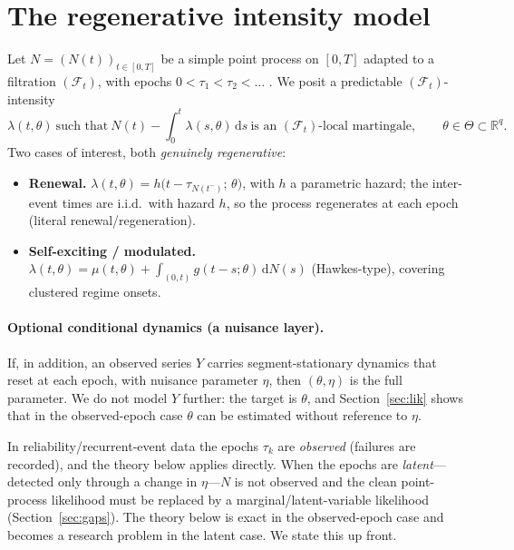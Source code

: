 \documentclass[smallextended,natbib]{svjour3}
\newcommand{\dd}{\,\mathrm{d}}
\newcommand{\R}{\mathbb{R}}
\newcommand{\F}{\mathcal{F}}
\begin{document}
\section{The regenerative intensity model}

Let $N=(N(t))_{t\in[0,T]}$ be a simple point process on $[0,T]$ adapted to a
filtration $(\F_t)$, with epochs $0<\tau_1<\tau_2<\dots$ . We posit a predictable
$(\F_t)$-intensity
\begin{equation}\label{eq:intensity}
\lambda(t,\theta)\ \text{such that}\
N(t)-\int_0^t \lambda(s,\theta)\dd s\ \text{is an $(\F_t)$-local martingale},
\qquad \theta\in\Theta\subset\R^q .
\end{equation}
Two cases of interest, both \emph{genuinely regenerative}:
\begin{itemize}
\item[(R)] \textbf{Renewal.} $\lambda(t,\theta)=h\!\big(t-\tau_{N(t^-)};\,\theta\big)$,
with $h$ a parametric hazard; the inter-event times are i.i.d.\ with hazard $h$,
so the process regenerates at each epoch (literal renewal/regeneration).
\item[(SE)] \textbf{Self-exciting / modulated.}
$\lambda(t,\theta)=\mu(t,\theta)+\int_{(0,t)} g(t-s;\theta)\dd N(s)$ (Hawkes-type),
covering clustered regime onsets.
\end{itemize}

\paragraph{Optional conditional dynamics (a nuisance layer).}
If, in addition, an observed series $Y$ carries segment-stationary dynamics that
reset at each epoch, with nuisance parameter $\eta$, then $(\theta,\eta)$ is the
full parameter. We do not model $Y$ further: the target is $\theta$, and
Section~\ref{sec:lik} shows that in the observed-epoch case $\theta$ can be
estimated without reference to $\eta$.

\begin{remark}\label{rem:latent}
In reliability/recurrent-event data the epochs $\tau_k$ are \emph{observed}
(failures are recorded), and the theory below applies directly. When the epochs are
\emph{latent}---detected only through a change in $\eta$---$N$ is not observed and
the clean point-process likelihood must be replaced by a marginal/latent-variable
likelihood (Section~\ref{sec:gaps}). The theory below is exact in the
observed-epoch case and becomes a research problem in the latent case. We state
this up front.
\end{remark}
\end{document}
